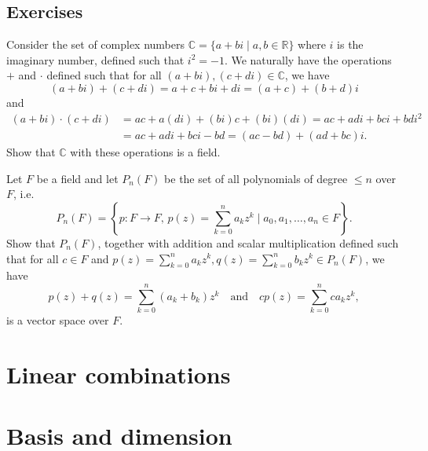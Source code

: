 \subsection*{Exercises}

\begin{exer}\label{exer:cfield}
Consider the set of complex numbers $ \mathbb{C}=\{a+bi\mid a,b\in\mathbb{R}\} $ where $ i $ is the imaginary number, defined such that $ i^2=-1 $. We naturally have the operations $ + $ and $ \cdot $ defined such that for all $ (a+bi),(c+di)\in\mathbb{C} $, we have
\begin{equation*}
    (a+bi)+(c+di)=a+c+bi+di=(a+c)+(b+d)i
\end{equation*}
and
\begin{align*}
    (a+bi)\cdot(c+di) &= ac+a(di)+(bi)c+(bi)(di)=ac+adi+bci+bdi^2 \\
    &= ac+adi+bci-bd=(ac-bd)+(ad+bc)i.
\end{align*}
Show that $ \mathbb{C} $ with these operations is a field.
\end{exer}

\begin{exer}\label{exer:pnvs}
Let $ F $ be a field and let $ P_n(F) $ be the set of all polynomials of degree $ \leq n $ over $ F $, i.e.
\begin{equation*}
    P_n(F)=\left\{p:F\to F,\,p(z)=\sum_{k=0}^n a_k z^k\mid a_0,a_1,\ldots,a_n\in F\right\}.
\end{equation*}
Show that $ P_n(F) $, together with addition and scalar multiplication defined such that for all $ c\in F $ and $ p(z)=\sum_{k=0}^n a_k z^k,q(z)=\sum_{k=0}^n b_k z^k\in P_n(F) $, we have
\begin{equation*}
    p(z)+q(z)=\sum_{k=0}^n (a_k+b_k)z^k \quad\text{and}\quad cp(z)=\sum_{k=0}^n ca_k z^k,
\end{equation*}
is a vector space over $ F $.
\end{exer}

\section{Linear combinations}

\section{Basis and dimension}